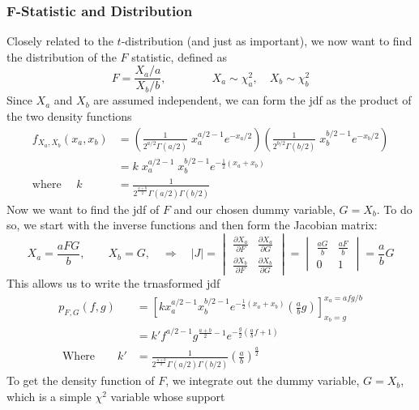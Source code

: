 \documentclass[a4paper,12pt]{scrartcl}
\begin{document}
\newpage
\subsubsection{F-Statistic and Distribution}

Closely related to the $t$-distribution (and just as important),
we now want to find the distribution of the $F$ statistic, defined as
\[ F = \frac{ X_a / a}{X_b / b},\qquad\qquad X_a \sim \chi^2_a, \quad
   X_b \sim \chi^2_b \]
Since $X_a$ and $X_b$ are assumed independent,
we can form the jdf as the product of the two density functions
\begin{align*}
   f_{X_a, X_b}(x_a, x_b) &= \left(\frac{1}{2^{a/2} \Gamma(a/2)}
      \; x_a^{a/2 -1} e^{-x_a/2 }\right) \left(
      \frac{1}{2^{b/2}  \Gamma(b/2)} \;
      x_b^{b/2 -1} e^{- x_b /2} \right)\\
   &= k \; x_a^{a/2 -1} \; x_b^{b/2 -1} e^{-\frac{1}{2}(x_a + x_b)} \\
   \text{where } \quad k &= \frac{1}{ 2^{\frac{a+b}{2}} \Gamma(a/2)
      \Gamma(b/2)}
\end{align*}
Now we want to find the jdf of $F$ and our chosen dummy variable,
$G=X_b$. To do so, we start with the inverse functions and
then form the Jacobian matrix:
   \[ X_a = \frac{a FG}{b}, \qquad X_b = G, \quad\Rightarrow \quad
     |J| = \begin{vmatrix} \frac{\partial X_a}{\partial F} &
      \frac{\partial X_a}{\partial G} \\
      \frac{\partial X_b}{\partial F} &
      \frac{\partial X_b}{\partial G} \end{vmatrix} =
      \begin{vmatrix}
	 \frac{a G}{b} & \frac{a F}{b} \\ 0 & 1
      \end{vmatrix}
      = \frac{a}{b} G
      \]
This allows us to write the trnasformed jdf
\begin{align*}
   p_{F,G}(f,g) &= \left[
      k x_a^{a/2 -1} x_b^{b/2 -1} e^{-\frac{1}{2}(x_a + x_b)}
      \left( \frac{a}{b} g\right) \right]^{x_a = a f g/b}_{x_b = g}\\
   &= k' f^{a/2 -1} g^{\frac{a+b}{2}-1} e^{-\frac{g}{2}\left(
      \frac{a}{b}f +1 \right)} \\
   \text{ Where} \qquad k' &= \frac{1}{ 2^{\frac{a+b}{2}} \Gamma(a/2)
      \Gamma(b/2)} \left( \frac{a}{b}\right)^{\frac{a}{2}}
\end{align*}
To get the density function of $F$, we integrate out the dummy
variable, $G=X_b$, which is a simple $\chi^2$ variable whose support
\end{document}

